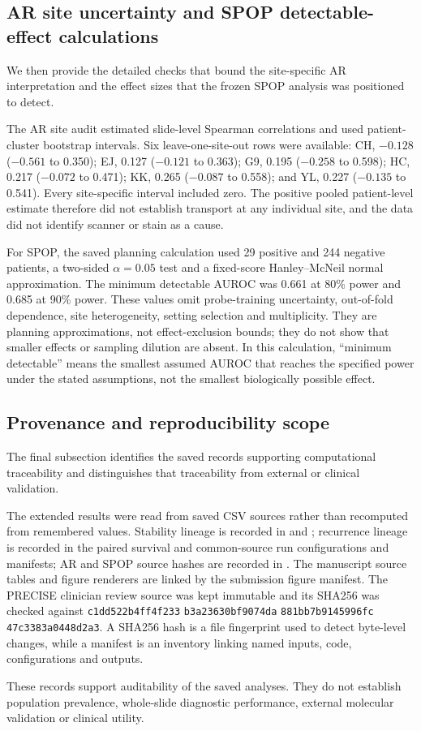 \clearpage

\subsection*{AR site uncertainty and SPOP detectable-effect calculations}

We then provide the detailed checks that bound the site-specific AR interpretation and the
effect sizes that the frozen SPOP analysis was positioned to detect.

The AR site audit estimated slide-level Spearman correlations and used patient-cluster
bootstrap intervals. Six leave-one-site-out rows were available: CH, $-0.128$
($-0.561$ to 0.350); EJ, 0.127 ($-0.121$ to 0.363); G9, 0.195 ($-0.258$ to 0.598);
HC, 0.217 ($-0.072$ to 0.471); KK, 0.265 ($-0.087$ to 0.558); and YL, 0.227
($-0.135$ to 0.541). Every site-specific interval included zero. The positive pooled
patient-level estimate therefore did not establish transport at any individual site, and
the data did not identify scanner or stain as a cause.

For SPOP, the saved planning calculation used 29 positive and 244 negative patients, a
two-sided $\alpha=0.05$ test and a fixed-score Hanley--McNeil normal approximation. The
minimum detectable AUROC was 0.661 at 80\% power and 0.685 at 90\% power. These values omit
probe-training uncertainty, out-of-fold dependence, site heterogeneity, setting selection
and multiplicity. They are planning approximations, not effect-exclusion bounds; they do
not show that smaller effects or sampling dilution are absent. In this calculation,
``minimum detectable'' means the smallest assumed AUROC that reaches the specified power
under the stated assumptions, not the smallest biologically possible effect.

\subsection*{Provenance and reproducibility scope}

The final subsection identifies the saved records supporting computational traceability and
distinguishes that traceability from external or clinical validation.

The extended results were read from saved CSV sources rather than recomputed from remembered
values. Stability lineage is recorded in  and
; recurrence lineage is recorded in the paired
survival and common-source run configurations and manifests; AR and SPOP source hashes are
recorded in . The manuscript source tables
and figure renderers are linked by the submission figure manifest. The PRECISE clinician
review source was kept immutable and its SHA256 was checked against
\texttt{c1dd522b}\allowbreak\texttt{4ff4f233}\allowbreak
\texttt{b3a23630}\allowbreak\texttt{bf9074da}\allowbreak
\texttt{881bb7b9}\allowbreak\texttt{145996fc}\allowbreak
\texttt{47c3383a}\allowbreak\texttt{0448d2a3}.
A SHA256 hash is a file fingerprint used to detect byte-level changes, while a manifest is
an inventory linking named inputs, code, configurations and outputs.

These records support auditability of the saved analyses. They do not establish population
prevalence, whole-slide diagnostic performance, external molecular validation or clinical
utility.
